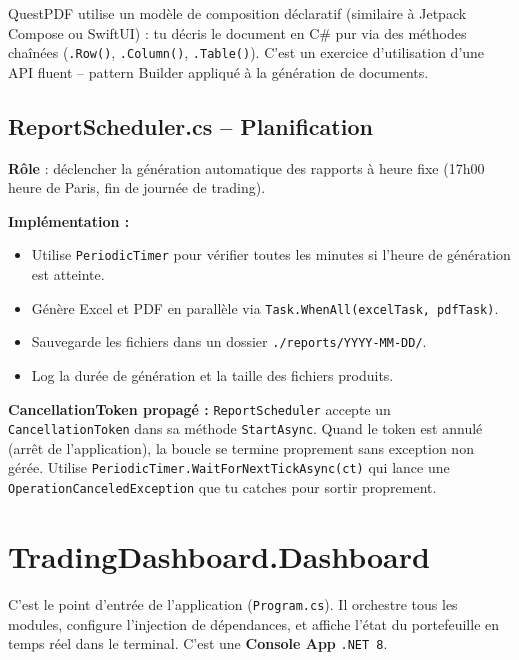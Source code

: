 \documentclass[a4paper,11pt]{article}
\newcommand{\cs}[1]{\texttt{\color{codeinline}#1}}
\begin{document}
\begin{tcolorbox}[note]
QuestPDF utilise un modèle de composition déclaratif (similaire à
Jetpack Compose ou SwiftUI) : tu décris le document en C\# pur via des
méthodes chaînées (\cs{.Row()}, \cs{.Column()},
\cs{.Table()}). C'est un exercice d'utilisation d'une API fluent -- pattern
Builder appliqué à la génération de documents.
\end{tcolorbox}

\subsection{ReportScheduler.cs -- Planification}

\textbf{Rôle} : déclencher la génération automatique des rapports
à heure fixe (17h00 heure de Paris, fin de journée de trading).

\textbf{Implémentation :}
\begin{itemize}
  \item Utilise \cs{PeriodicTimer} pour vérifier toutes les minutes si
        l'heure de génération est atteinte.
  \item Génère Excel et PDF en parallèle via
        \cs{Task.WhenAll(excelTask, pdfTask)}.
  \item Sauvegarde les fichiers dans un dossier \cs{./reports/YYYY-MM-DD/}.
  \item Log la durée de génération et la taille des fichiers produits.
\end{itemize}

\begin{tcolorbox}[constraint]
\textbf{CancellationToken propagé :} \cs{ReportScheduler} accepte un
\cs{CancellationToken} dans sa méthode \cs{StartAsync}. Quand le token
est annulé (arrêt de l'application), la boucle se termine proprement sans
exception non gérée. Utilise \cs{PeriodicTimer.WaitForNextTickAsync(ct)}
qui lance une \cs{OperationCanceledException} que tu catches pour sortir
proprement.
\end{tcolorbox}

\newpage

\section{TradingDashboard.Dashboard}

\begin{tcolorbox}[note]
C'est le point d'entrée de l'application (\cs{Program.cs}). Il orchestre
tous les modules, configure l'injection de dépendances, et affiche l'état
du portefeuille en temps réel dans le terminal. C'est une \textbf{Console App}
\cs{.NET 8}.
\end{tcolorbox}
\end{document}
